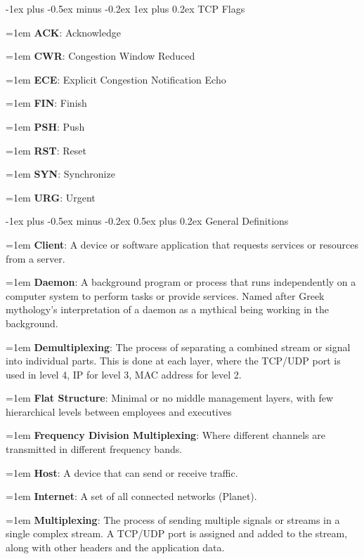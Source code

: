 \documentclass[letterpaper,8pt]{extarticle}
\makeatletter
\newcommand{\definition}[2]{
  \hangindent=1em
  \textbf{#1}: #2%
}
\renewcommand{\section}{\@startsection{section}{1}{0mm}%
  {-1ex plus -0.5ex minus -0.2ex}%
  {0.5ex plus 0.2ex}%
{\color{h1} \normalfont\small\bfseries}}
\renewcommand{\subsubsection}{\@startsection{subsubsection}{3}{0mm}%
  {-1ex plus -0.5ex minus -0.2ex}%
  {1ex plus 0.2ex}%
{\color{h3} \normalfont\fontsize{5.5}{5.5}\selectfont\bfseries\itshape}}
\makeatother
\begin{document}
\begin{multicols*}{5}
  \subsubsection{TCP Flags}

  \begin{multicols*}{2}

    \definition{ACK}{Acknowledge}

    \definition{CWR}{Congestion Window Reduced}

    \definition{ECE}{Explicit Congestion Notification Echo}

    \definition{FIN}{Finish}

    \definition{PSH}{Push}

    \definition{RST}{Reset}

    \definition{SYN}{Synchronize}

    \definition{URG}{Urgent}

  \end{multicols*}

  \section{General Definitions}

  \definition{Client}{A device or software application that requests services or resources from a server.}

  \definition{Daemon}{A background program or process that runs independently on a computer system to perform tasks or provide services. Named after Greek mythology's interpretation of a daemon as a mythical being working in the background.}

  \definition{Demultiplexing}{The process of separating a combined stream or signal into individual parts. This is done at each layer, where the TCP/UDP port is used in level 4, IP for level 3, MAC address for level 2.}

  \definition{Flat Structure}{Minimal or no middle management layers, with few hierarchical levels between employees and executives}

  \definition{Frequency Division Multiplexing}{Where different channels are transmitted in different frequency bands.}

  \definition{Host}{A device that can send or receive traffic.}

  \definition{Internet}{A set of all connected networks (Planet).}

  \definition{Multiplexing}{The process of sending multiple signals or streams in a single complex stream. A TCP/UDP port is assigned and added to the stream, along with other headers and the application data.}


\end{multicols*}
\end{document}
